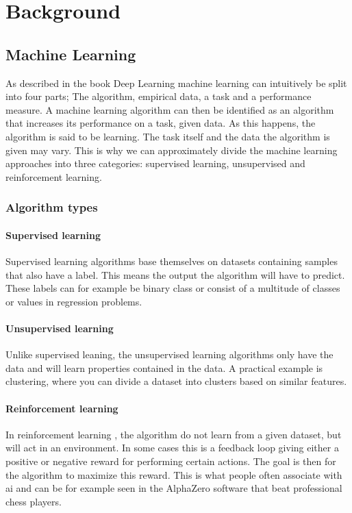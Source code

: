 \chapter{Background}
\section{Machine Learning} \label{Machine Learning}
    As described in the book Deep Learning\cite{Goodfellow-et-al-2016_ML} machine learning can intuitively be split into four parts; The algorithm, empirical data, a task and a performance measure. A machine learning algorithm can then be identified as an algorithm that increases its performance on a task, given data. As this happens, the algorithm is said to be learning. The task itself and the data the algorithm is given may vary. This is why we can approximately divide the machine learning approaches into three categories\cite{Goodfellow-et-al-2016_E}: supervised learning, unsupervised and reinforcement learning. 
    
    \subsection{Algorithm types} \label{Algorithm types}
        \subsubsection{Supervised learning}
            Supervised learning \cite{Goodfellow-et-al-2016_E} algorithms base themselves on datasets containing samples that also have a label. This means the output the algorithm will have to predict. These labels can for example be binary class or consist of a multitude of classes or values in regression problems.
            
        \subsubsection{Unsupervised learning}
            Unlike supervised leaning, the unsupervised learning \cite{Goodfellow-et-al-2016_E} algorithms only have the data and will learn properties contained in the data. A practical example is clustering, where you can divide a dataset into clusters based on similar features. 
                
        \subsubsection{Reinforcement learning}
            In reinforcement learning \cite{Goodfellow-et-al-2016_E}, the algorithm do not learn from a given dataset, but will act in an environment. In some cases this is a feedback loop giving either a positive or negative reward for performing certain actions. The goal is then for the algorithm to maximize this reward. This is what people often associate with \gls{ai} and can be for example seen in the AlphaZero software that beat professional chess players\cite{silver2017mastering}.
    
